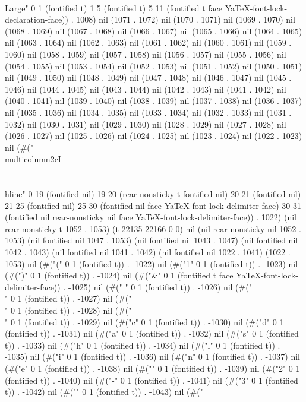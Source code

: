 {    \\Large" 0 1 (fontified t) 1 5 (fontified t) 5 11 (fontified t face YaTeX-font-lock-declaration-face)) . 1008) nil (1071 . 1072) nil (1070 . 1071) nil (1069 . 1070) nil (1068 . 1069) nil (1067 . 1068) nil (1066 . 1067) nil (1065 . 1066) nil (1064 . 1065) nil (1063 . 1064) nil (1062 . 1063) nil (1061 . 1062) nil (1060 . 1061) nil (1059 . 1060) nil (1058 . 1059) nil (1057 . 1058) nil (1056 . 1057) nil (1055 . 1056) nil (1054 . 1055) nil (1053 . 1054) nil (1052 . 1053) nil (1051 . 1052) nil (1050 . 1051) nil (1049 . 1050) nil (1048 . 1049) nil (1047 . 1048) nil (1046 . 1047) nil (1045 . 1046) nil (1044 . 1045) nil (1043 . 1044) nil (1042 . 1043) nil (1041 . 1042) nil (1040 . 1041) nil (1039 . 1040) nil (1038 . 1039) nil (1037 . 1038) nil (1036 . 1037) nil (1035 . 1036) nil (1034 . 1035) nil (1033 . 1034) nil (1032 . 1033) nil (1031 . 1032) nil (1030 . 1031) nil (1029 . 1030) nil (1028 . 1029) nil (1027 . 1028) nil (1026 . 1027) nil (1025 . 1026) nil (1024 . 1025) nil (1023 . 1024) nil (1022 . 1023) nil (#("\\multicolumn{2}{cI}{} \\\\ \\hline" 0 19 (fontified nil) 19 20 (rear-nonsticky t fontified nil) 20 21 (fontified nil) 21 25 (fontified nil) 25 30 (fontified nil face YaTeX-font-lock-delimiter-face) 30 31 (fontified nil rear-nonsticky nil face YaTeX-font-lock-delimiter-face)) . 1022) (nil rear-nonsticky t 1052 . 1053) (t 22135 22166 0 0) nil (nil rear-nonsticky nil 1052 . 1053) (nil fontified nil 1047 . 1053) (nil fontified nil 1043 . 1047) (nil fontified nil 1042 . 1043) (nil fontified nil 1041 . 1042) (nil fontified nil 1022 . 1041) (1022 . 1053) nil (#("(" 0 1 (fontified t)) . -1022) nil (#("1" 0 1 (fontified t)) . -1023) nil (#(")" 0 1 (fontified t)) . -1024) nil (#("&" 0 1 (fontified t face YaTeX-font-lock-delimiter-face)) . -1025) nil (#(" " 0 1 (fontified t)) . -1026) nil (#("\\" 0 1 (fontified t)) . -1027) nil (#("\\" 0 1 (fontified t)) . -1028) nil (#("\\" 0 1 (fontified t)) . -1029) nil (#("c" 0 1 (fontified t)) . -1030) nil (#("d" 0 1 (fontified t)) . -1031) nil (#("a" 0 1 (fontified t)) . -1032) nil (#("s" 0 1 (fontified t)) . -1033) nil (#("h" 0 1 (fontified t)) . -1034) nil (#("l" 0 1 (fontified t)) . -1035) nil (#("i" 0 1 (fontified t)) . -1036) nil (#("n" 0 1 (fontified t)) . -1037) nil (#("e" 0 1 (fontified t)) . -1038) nil (#("{" 0 1 (fontified t)) . -1039) nil (#("2" 0 1 (fontified t)) . -1040) nil (#("-" 0 1 (fontified t)) . -1041) nil (#("3" 0 1 (fontified t)) . -1042) nil (#("}" 0 1 (fontified t)) . -1043) nil (#("
}
